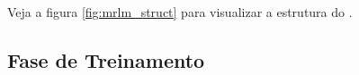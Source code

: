 %   
  
  Veja a figura \ref{fig:mrlm_struct} para visualizar a estrutura do \MRLMa.
  
  
  
  

 
 
 \subsection{Fase de Treinamento}
 
%  
%  

